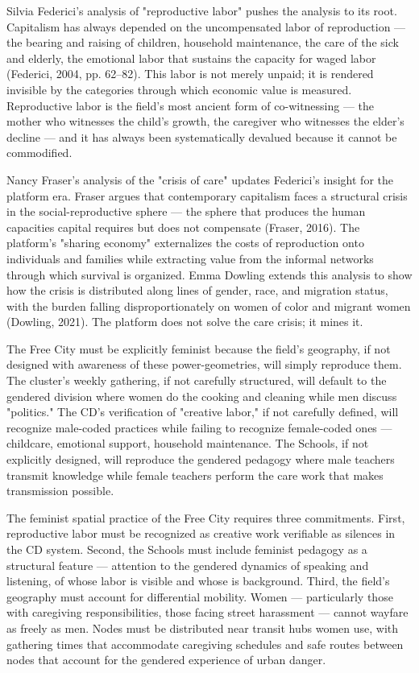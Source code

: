 Silvia Federici's analysis of "reproductive labor" pushes the analysis to its root. Capitalism has always depended on the uncompensated labor of reproduction — the bearing and raising of children, household maintenance, the care of the sick and elderly, the emotional labor that sustains the capacity for waged labor (Federici, 2004, pp. 62–82). This labor is not merely unpaid; it is rendered invisible by the categories through which economic value is measured. Reproductive labor is the field's most ancient form of co-witnessing — the mother who witnesses the child's growth, the caregiver who witnesses the elder's decline — and it has always been systematically devalued because it cannot be commodified.

Nancy Fraser's analysis of the "crisis of care" updates Federici's insight for the platform era. Fraser argues that contemporary capitalism faces a structural crisis in the social-reproductive sphere — the sphere that produces the human capacities capital requires but does not compensate (Fraser, 2016). The platform's "sharing economy" externalizes the costs of reproduction onto individuals and families while extracting value from the informal networks through which survival is organized. Emma Dowling extends this analysis to show how the crisis is distributed along lines of gender, race, and migration status, with the burden falling disproportionately on women of color and migrant women (Dowling, 2021). The platform does not solve the care crisis; it mines it.

The Free City must be explicitly feminist because the field's geography, if not designed with awareness of these power-geometries, will simply reproduce them. The cluster's weekly gathering, if not carefully structured, will default to the gendered division where women do the cooking and cleaning while men discuss "politics." The CD's verification of "creative labor," if not carefully defined, will recognize male-coded practices while failing to recognize female-coded ones — childcare, emotional support, household maintenance. The  Schools, if not explicitly designed, will reproduce the gendered pedagogy where male teachers transmit knowledge while female teachers perform the care work that makes transmission possible.

The feminist spatial practice of the Free City requires three commitments. First, reproductive labor must be recognized as creative work verifiable as silences in the CD system. Second, the   Schools must include feminist pedagogy as a structural feature — attention to the gendered dynamics of speaking and listening, of whose labor is visible and whose is background. Third, the field's geography must account for differential mobility. Women — particularly those with caregiving responsibilities, those facing street harassment — cannot wayfare as freely as men. Nodes must be distributed near transit hubs women use, with gathering times that accommodate caregiving schedules and safe routes between nodes that account for the gendered experience of urban danger.

